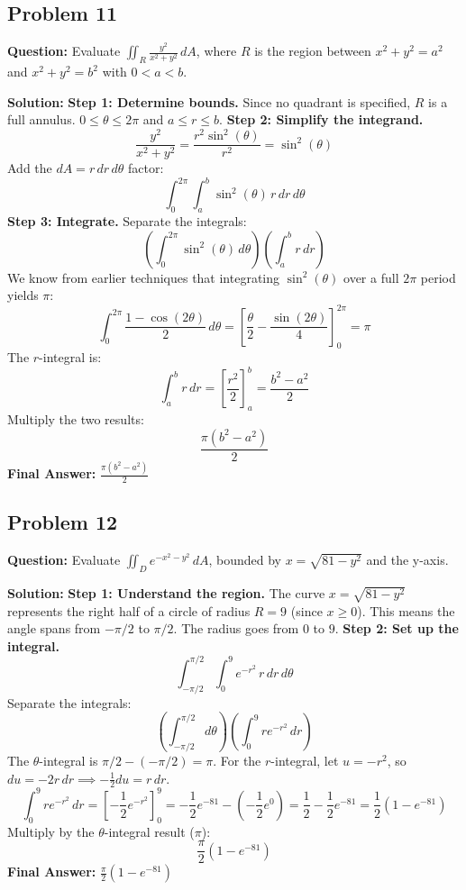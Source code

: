 \documentclass[12pt]{article}
\begin{document}
\subsection*{Problem 11}
\textbf{Question:} Evaluate $\iint_R \frac{y^2}{x^2+y^2} \, dA$, where $R$ is the region between $x^2+y^2=a^2$ and $x^2+y^2=b^2$ with $0 < a < b$.

\textbf{Solution:}
\textbf{Step 1: Determine bounds.}
Since no quadrant is specified, $R$ is a full annulus. $0 \le \theta \le 2\pi$ and $a \le r \le b$.
\textbf{Step 2: Simplify the integrand.}
\[ \frac{y^2}{x^2+y^2} = \frac{r^2\sin^2(\theta)}{r^2} = \sin^2(\theta) \]
Add the $dA = r \, dr \, d\theta$ factor:
\[ \int_0^{2\pi} \int_a^b \sin^2(\theta) \, r \, dr \, d\theta \]
\textbf{Step 3: Integrate.}
Separate the integrals:
\[ \left( \int_0^{2\pi} \sin^2(\theta) \, d\theta \right) \left( \int_a^b r \, dr \right) \]
We know from earlier techniques that integrating $\sin^2(\theta)$ over a full $2\pi$ period yields $\pi$:
\[ \int_0^{2\pi} \frac{1-\cos(2\theta)}{2} \, d\theta = \left[ \frac{\theta}{2} - \frac{\sin(2\theta)}{4} \right]_0^{2\pi} = \pi \]
The $r$-integral is:
\[ \int_a^b r \, dr = \left[ \frac{r^2}{2} \right]_a^b = \frac{b^2 - a^2}{2} \]
Multiply the two results:
\[ \frac{\pi(b^2 - a^2)}{2} \]
\textbf{Final Answer:} $\frac{\pi(b^2 - a^2)}{2}$

\subsection*{Problem 12}
\textbf{Question:} Evaluate $\iint_D e^{-x^2-y^2} \, dA$, bounded by $x = \sqrt{81-y^2}$ and the y-axis.

\textbf{Solution:}
\textbf{Step 1: Understand the region.}
The curve $x = \sqrt{81-y^2}$ represents the right half of a circle of radius $R = 9$ (since $x \ge 0$).
This means the angle spans from $-\pi/2$ to $\pi/2$. The radius goes from $0$ to $9$.
\textbf{Step 2: Set up the integral.}
\[ \int_{-\pi/2}^{\pi/2} \int_0^9 e^{-r^2} \, r \, dr \, d\theta \]
Separate the integrals:
\[ \left( \int_{-\pi/2}^{\pi/2} d\theta \right) \left( \int_0^9 r e^{-r^2} \, dr \right) \]
The $\theta$-integral is $\pi/2 - (-\pi/2) = \pi$.
For the $r$-integral, let $u = -r^2$, so $du = -2r \, dr \implies -\frac{1}{2}du = r \, dr$.
\[ \int_0^9 r e^{-r^2} \, dr = \left[ -\frac{1}{2}e^{-r^2} \right]_0^9 = -\frac{1}{2}e^{-81} - \left(-\frac{1}{2}e^0\right) = \frac{1}{2} - \frac{1}{2}e^{-81} = \frac{1}{2}(1 - e^{-81}) \]
Multiply by the $\theta$-integral result ($\pi$):
\[ \frac{\pi}{2}(1 - e^{-81}) \]
\textbf{Final Answer:} $\frac{\pi}{2}(1 - e^{-81})$
\end{document}
